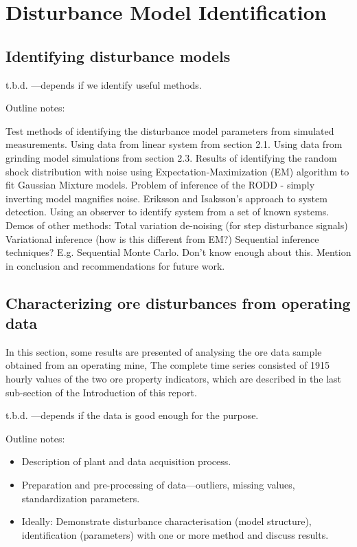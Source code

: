 \chapter{Disturbance Model Identification}
\label{chap-identification}

\section{Identifying disturbance models}

t.b.d. —depends if we identify useful methods.

Outline notes:
\begin{outline}
	\1 Test methods of identifying the disturbance model parameters from simulated measurements.
	\2 Using data from linear system from section 2.1.
	\2 Using data from grinding model simulations from section 2.3.
	\1 Results of identifying the random shock distribution with noise using Expectation-Maximization (EM) algorithm to fit Gaussian Mixture models.
	\1 Problem of inference of the RODD - simply inverting model magnifies noise.
	\1 Eriksson and Isaksson's approach to system detection. Using an observer to identify system from a set of known systems.
	\1 Demos of other methods:
	  \2 Total variation de-noising (for step disturbance signals)
	  \2 Variational inference (how is this different from EM?)
	\1 Sequential inference techniques? E.g. Sequential Monte Carlo. Don't know enough about this. Mention in conclusion and recommendations for future work.
\end{outline}

\section{Characterizing ore disturbances from operating data}

In this section, some results are presented of analysing the ore data sample obtained from an operating mine, The complete time series consisted of 1915 hourly values of the two ore property indicators, which are described in the last sub-section of the Introduction of this report.



t.b.d. —depends if the data is good enough for the purpose.

Outline notes:
\begin{itemize}
	\item Description of plant and data acquisition process.
	\item Preparation and pre-processing of data—outliers, missing values, standardization parameters.
	\item Ideally: Demonstrate disturbance characterisation (model structure), identification (parameters) with one or more method and discuss results. 
\end{itemize}